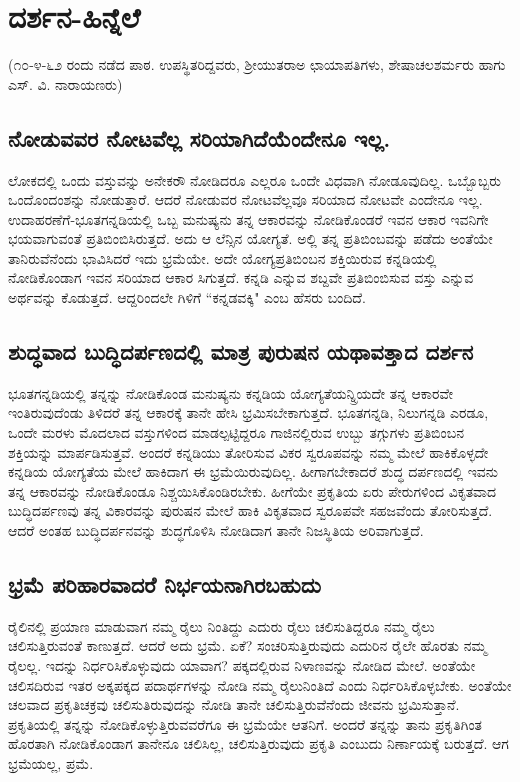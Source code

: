\chapter{ದರ್ಶನ-ಹಿನ್ನೆಲೆ}

(೧೦-೪-೬೨ ರಂದು ನಡೆದ ಪಾಠ. ಉಪಸ್ಥಿತರಿದ್ದವರು, ಶ್ರೀಯುತರಾಅ ಛಾಯಾಪತಿಗಳು, ಶೇಷಾಚಲಶರ್ಮರು ಹಾಗು ಎಸ್. ವಿ. ನಾರಾಯಣರು)

\section*{ನೋಡುವವರ ನೋಟವೆಲ್ಲ ಸರಿಯಾಗಿದೆಯೆಂದೇನೂ ಇಲ್ಲ.}

ಲೋಕದಲ್ಲಿ ಒಂದು ವಸ್ತುವನ್ನು ಅನೇಕರೌ ನೋಡಿದರೂ ಎಲ್ಲರೂ ಒಂದೇ ವಿಧವಾಗಿ ನೋಡೂವುದಿಲ್ಲ. ಒಬ್ಬೊಬ್ಬರು ಒಂದೊಂದಂಶನ್ನು ನೋಡುತ್ತಾರೆ. ಆದರೆ ನೋಡುವರ ನೋಟವೆಲ್ಲವೂ ಸರಿಯಾದ ನೋಟವೇ ಎಂದೇನೂ ಇಲ್ಲ. ಉದಾಹರಣೆಗೆ-ಭೂತಗನ್ನಡಿಯಲ್ಲಿ ಒಬ್ಬ ಮನುಷ್ಯನು ತನ್ನ ಆಕಾರವನ್ನು ನೋಡಿಕೊಂಡರೆ ಇವನ ಆಕಾರ ಇವನಿಗೇ ಭಯವಾಗುವಂತೆ ಪ್ರತಿಬಿಂಬಿಸಿರುತ್ತದೆ. ಅದು ಆ ಲೆನ್ಸಿನ ಯೋಗ್ಯತೆ. ಅಲ್ಲಿ ತನ್ನ ಪ್ರತಿಬಿಂಬವನ್ನು ಪಡೆದು ಅಂತೆಯೇ ತಾನಿರುವೆನೆಂದು ಭಾವಿಸಿದರೆ ಇದು ಭ್ರಮೆಯೇ. ಅದೇ ಯೋಗ್ಯಪ್ರತಿಬಿಂಬನ ಶಕ್ತಿಯಿರುವ ಕನ್ನಡಿಯಲ್ಲಿ ನೋಡಿಕೊಂಡಾಗ ಇವನ ಸರಿಯಾದ ಆಕಾರ ಸಿಗುತ್ತದೆ. ಕನ್ನಡಿ ಎನ್ನುವ ಶಬ್ದವೇ ಪ್ರತಿಬಿಂಬಿಸುವ ವಸ್ತು ಎನ್ನುವ ಅರ್ಥವನ್ನು ಕೊಡುತ್ತದೆ. ಆದ್ದರಿಂದಲೇ ಗಿಳಿಗೆ ``ಕನ್ನಡವಕ್ಕಿ" ಎಂಬ ಹೆಸರು ಬಂದಿದೆ.

\section*{ಶುದ್ಧವಾದ ಬುದ್ಧಿದರ್ಪಣದಲ್ಲಿ ಮಾತ್ರ ಪುರುಷನ ಯಥಾವತ್ತಾದ ದರ್ಶನ}

ಭೂತಗನ್ನಡಿಯಲ್ಲಿ ತನ್ನನ್ನು ನೋಡಿಕೊಂಡ ಮನುಷ್ಯನು ಕನ್ನಡಿಯ ಯೋಗ್ಯತೆಯನ್ನ್ರಿಯದೇ ತನ್ನ ಆಕಾರವೇ ಇಂತಿರುವುದೆಂಡು ತಿಳಿದರೆ ತನ್ನ ಆಕಾರಕ್ಕೆ ತಾನೇ ಹೇಸಿ ಭ್ರಮಿಸಬೇಕಾಗುತ್ತದೆ. ಭೂತಗನ್ನಡಿ, ನಿಲುಗನ್ನಡಿ ಎರಡೂ, ಒಂದೇ ಮರಳು ಮೊದಲಾದ ವಸ್ತುಗಳಿಂದ ಮಾಡಲ್ಪಟ್ಟಿದ್ದರೂ ಗಾಜಿನಲ್ಲಿರುವ ಉಬ್ಬು ತಗ್ಗುಗಳು ಪ್ರತಿಬಿಂಬನ ಶಕ್ತಿಯನ್ನು ಮಾರ್ಪಡಿಸುತ್ತವೆ. ಅಂದರೆ ಕನ್ನಡಿಯು ತೋರಿಸುವ ವಿಕರ ಸ್ವರೂಪವನ್ನು ನಮ್ಮ ಮೇಲೆ ಹಾಕಿಕೊಳ್ಳದೇ ಕನ್ನಡಿಯ ಯೋಗ್ಯತೆಯ ಮೇಲೆ ಹಾಕಿದಾಗ ಈ ಭ್ರಮೆಯಿರುವುದಿಲ್ಲ. ಹೀಗಾಗಬೇಕಾದರೆ ಶುದ್ಧ ದರ್ಪಣದಲ್ಲಿ ಇವನು ತನ್ನ ಆಕಾರವನ್ನು ನೋಡಿಕೊಂಡೂ ನಿಶ್ಚಯಿಸಿಕೊಂಡಿರಬೇಕು. ಹೀಗೆಯೇ ಪ್ರಕೃತಿಯ ಏರು ಪೇರುಗಳಿಂದ ವಿಕೃತವಾದ ಬುದ್ಧಿದರ್ಪಣವು ತನ್ನ ವಿಕಾರವನ್ನು ಪುರುಷನ ಮೇಲೆ ಹಾಕಿ ವಿಕೃತವಾದ ಸ್ವರೂಪವೇ ಸಹಜವೆಂದು ತೋರಿಸುತ್ತದೆ. ಆದರೆ ಅಂತಹ ಬುದ್ಧಿದರ್ಪನವನ್ನು ಶುದ್ಧಗೊಳಿಸಿ ನೋಡಿದಾಗ ತಾನೇ ನಿಜಸ್ಥಿತಿಯ ಅರಿವಾಗುತ್ತದೆ.

\section*{ಭ್ರಮೆ ಪರಿಹಾರವಾದರೆ ನಿರ್ಭಯನಾಗಿರಬಹುದು}

ರೈಲಿನಲ್ಲಿ ಪ್ರಯಾಣ ಮಾಡುವಾಗ ನಮ್ಮ ರೈಲು ನಿಂತಿದ್ದು ಎದುರು ರೈಲು ಚಲಿಸುತಿದ್ದರೂ ನಮ್ಮ ರೈಲು ಚಲಿಸುತ್ತಿರುವಂತೆ ಕಾಣುತ್ತದೆ. ಆದರೆ ಅದು ಭ್ರಮೆ. ಏಕೆ? ಸಂಚರಿಸುತ್ತಿರುವುದು ಎದುರಿನ ರೈಲೇ ಹೊರತು ನಮ್ಮ ರೈಲಲ್ಲ. ಇದನ್ನು ನಿರ್ಧರಿಸಿಕೊಳ್ಳುವುದು ಯಾವಾಗ? ಪಕ್ಕದಲ್ಲಿರುವ ನಿಳಾಣವನ್ನು ನೋಡಿದ ಮೇಲೆ. ಅಂತೆಯೇ ಚಲಿಸದಿರುವ ಇತರ ಅಕ್ಕಪಕ್ಕದ ಪದಾರ್ಥಗಳನ್ನು ನೋಡಿ ನಮ್ಮ ರೈಲುನಿಂತಿದೆ ಎಂದು ನಿರ್ಧರಿಸಿಕೊಳ್ಳಬೇಕು. ಅಂತೆಯೇ ಚಲವಾದ ಪ್ರಕೃತಿಚಕ್ರವು ಚಲಿಸುತಿರುವುದನ್ನು ನೋಡಿ ತಾನೇ ಚಲಿಸುತ್ತಿರುವೆನೆಂದು ಜೀವನು ಭ್ರಮಿಸುತ್ತಾನೆ. ಪ್ರಕೃತಿಯಲ್ಲಿ ತನ್ನನ್ನು ನೋಡಿಕೊಳ್ಳುತ್ತಿರುವವರೆಗೂ ಈ ಭ್ರಮೆಯೇ ಆತನಿಗೆ. ಅಂದರೆ ತನ್ನನ್ನು ತಾನು ಪ್ರಕೃತಿಗಿಂತ ಹೊರತಾಗಿ ನೋಡಿಕೊಂಡಾಗ ತಾನೇನೂ ಚಲಿಸಿಲ್ಲ, ಚಲಿಸುತ್ತಿರುವುದು ಪ್ರಕೃತಿ ಎಂಬುದು ನಿರ್ಣಾಯಕ್ಕೆ ಬರುತ್ತದೆ. ಆಗ ಭ್ರಮೆಯಲ್ಲ, ಪ್ರಮೆ.

